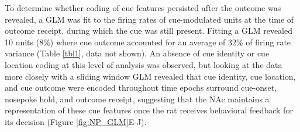 \documentclass[11pt]{article}
\begin{document}
To determine whether coding of cue features persisted after the outcome was revealed, a GLM was fit to the firing rates of cue-modulated units at the time of outcome receipt, during which the cue was still present. Fitting a GLM revealed 10 units (8\%) where cue outcome accounted for an average of 32\% of firing rate variance (Table \ref{tbl1}, data not shown). An absence of cue identity or cue location coding at this level of analysis was observed, but looking at the data more closely with a sliding window GLM revealed that cue identity, cue location, and cue outcome were encoded throughout time epochs surround cue-onset, nosepoke hold, and outcome receipt, suggesting that the NAc maintains a representation of these cue features once the rat receives behavioral feedback for its decision (Figure \ref{fig:NP_GLM}E-J).
\end{document}
